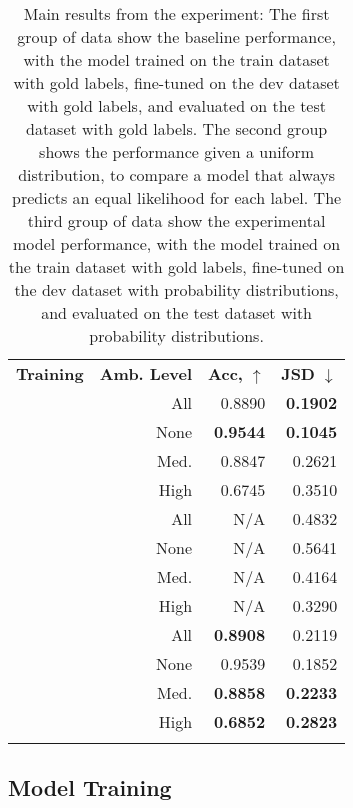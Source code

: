 \documentclass[11pt]{article}
\begin{document}
\begin{table}
  \begin{tabular}{lrrr}
    \Xhline{.8pt}
    \textbf{Training} & \textbf{Amb. Level} & \textbf{Acc,}  $\uparrow$ & \textbf{JSD} $\downarrow$ \\
    \Xhline{.1pt}
    \multirow{4}{*}{Baseline} & All  & 0.8890 & \textbf{0.1902} \\
                              & None & \textbf{0.9544} & \textbf{0.1045} \\
                              & Med. & 0.8847 & 0.2621 \\
                              & High & 0.6745 & 0.3510 \\
    \Xhline{.1pt}
    \multirow{4}{*}{Uniform}  & All  & N/A & 0.4832 \\
                              & None & N/A & 0.5641 \\
                              & Med. & N/A & 0.4164 \\
                              & High & N/A & 0.3290 \\
    \Xhline{.1pt}
    \multirow{4}{*}{Experiment}  & All  & \textbf{0.8908} & 0.2119  \\
                                 & None & 0.9539 & 0.1852 \\
                                 & Med. & \textbf{0.8858} & \textbf{0.2233} \\
                                 & High & \textbf{0.6852} & \textbf{0.2823} \\
    \Xhline{.8pt} 
  \end{tabular}
  \caption{Main results from the experiment: The first group of data show the baseline performance, with the
  model trained on the train dataset with gold labels, fine-tuned on the dev dataset with gold labels, and
  evaluated on the test dataset with gold labels. The second group shows the performance given a uniform distribution,
  to compare a model that always predicts an equal likelihood for each label. The third group of data show the
  experimental model performance, with the model trained on the train dataset with gold labels, fine-tuned on the
  dev dataset with probability distributions, and evaluated on the test dataset with probability distributions.}
\end{table}

\subsection{Model Training}
\end{document}
